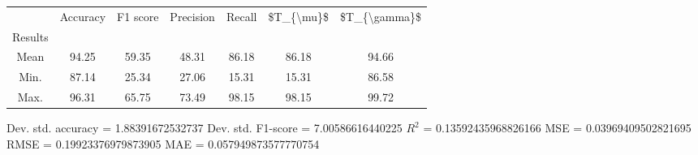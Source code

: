 \begin{tabular}{|c|c|c|c|c|c|c|}
\toprule
{} &  Accuracy &  F1 score &  Precision &  Recall &  \$T\_\{\textbackslash mu\}\$ &  \$T\_\{\textbackslash gamma\}\$ \\
Results &           &           &            &         &            &               \\
\hline
Mean    &     94.25 &     59.35 &      48.31 &   86.18 &      86.18 &         94.66 \\
Min.    &     87.14 &     25.34 &      27.06 &   15.31 &      15.31 &         86.58 \\
Max.    &     96.31 &     65.75 &      73.49 &   98.15 &      98.15 &         99.72 \\
\bottomrule
\end{tabular}

 Dev. std. accuracy = 1.88391672532737
 Dev. std. F1-score = 7.00586616440225
 $R^2$ = 0.13592435968826166
 MSE = 0.03969409502821695
 RMSE = 0.19923376979873905
 MAE = 0.057949873577770754